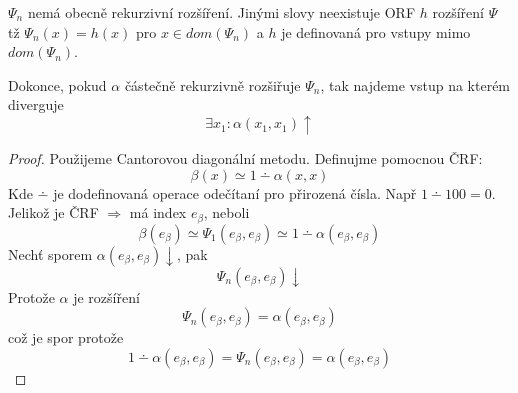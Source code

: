 \begin{theorem}
	$\Psi_n$ nemá obecně rekurzivní rozšíření.
	Jinými slovy neexistuje ORF $h$ rozšíření $\Psi$ tž
	$\Psi_n(x) = h(x)$ pro $x \in dom(\Psi_n)$ a $h$ je definovaná pro vstupy mimo $dom(\Psi_n)$.

	Dokonce, pokud $\alpha$ částečně rekurzivně rozšiřuje $\Psi_n$, tak najdeme vstup na kterém diverguje
	\[ \exists x_1: \alpha(x_1, x_1) \uparrow \]
\end{theorem}
\begin{proof}
	Použijeme Cantorovou diagonální metodu.
	Definujme pomocnou ČRF:
	\[ \beta(x) \simeq 1 \dotminus \alpha(x, x) \]
	Kde $\dotminus$ je dodefinovaná operace odečítaní pro přirozená čísla.
	Např $1 \dotminus 100 = 0$.
	Jelikož je ČRF $\Rightarrow$ má index $e_{\beta}$, neboli
	\[ \beta(e_{\beta}) \simeq \Psi_1(e_{\beta}, e_{\beta}) \simeq 1 \dotminus \alpha(e_{\beta}, e_{\beta}) \]
	Nechť sporem $\alpha(e_{\beta}, e_{\beta}) \downarrow$, pak
	\[ \Psi_n(e_{\beta}, e_{\beta}) \downarrow \]
	Protože $\alpha$ je rozšíření
	\[ \Psi_n(e_{\beta}, e_{\beta}) = \alpha(e_{\beta}, e_{\beta})\]
	což je spor protože
	\[ 1 \dotminus \alpha(e_{\beta}, e_{\beta}) = \Psi_n(e_{\beta}, e_{\beta}) = \alpha(e_{\beta}, e_{\beta})\]
\end{proof}
